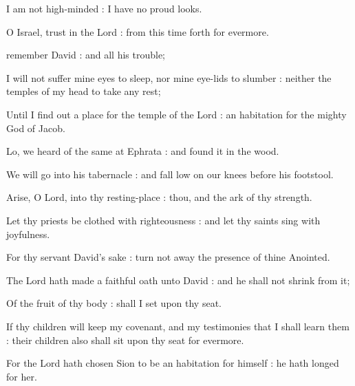 
 I am not high-minded : I have no proud looks.\par
{}
O Israel, trust in the Lord : from this time forth for evermore.\par



 remember David : and all his trouble;\par
{}
I will not suffer mine eyes to sleep, nor mine eye-lids to slumber : neither the temples of my head to take any rest;\par
{}Until I find out a place for the temple of the Lord : an habitation for the mighty God of Jacob.\par
{}Lo, we heard of the same at Ephrata : and found it in the wood.\par
{}We will go into his tabernacle : and fall low on our knees before his footstool.\par
{}Arise, O Lord, into thy resting-place : thou, and the ark of thy strength.\par
{}Let thy priests be clothed with righteousness : and let thy saints sing with joyfulness.\par
{}For thy servant David's sake : turn not away the presence of thine Anointed.\par
{}The Lord hath made a faithful oath unto David : and he shall not shrink from it;\par
{}Of the fruit of thy body : shall I set upon thy seat.\par
{}If thy children will keep my covenant, and my testimonies that I shall learn them : their children also shall sit upon thy seat for evermore.\par
{}For the Lord hath chosen Sion to be an habitation for himself : he hath longed for her.\par
